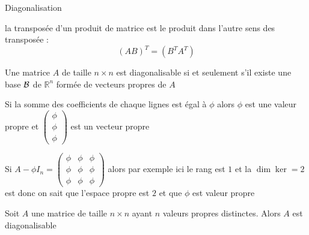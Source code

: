 \begin{parag}{Diagonalisation}
\begin{truc}
    la transposée d'un produit de matrice est le produit dans l'autre sens des transposée :
    \[(AB)^T = (B^TA^T)\]
\end{truc}
    \begin{theoreme}
        Une matrice $A$ de taille $n \times n$ est diagonalisable si et seulement s'il existe une base $\mathcal{B}$ de $\mathbb{R}^n$ formée de vecteurs propres de $A$
    \end{theoreme}
    \begin{truc}
        Si la somme des coefficients de chaque lignes est égal à $\phi$ alors $\phi$ est une valeur propre et $\begin{pmatrix}
            \phi \\ \phi \\ \phi
        \end{pmatrix}$ est un vecteur propre
    \end{truc}
    \begin{truc}
        Si $A - \phi I_n = \begin{pmatrix}
            \phi & \phi & \phi\\
            \phi & \phi & \phi\\
            \phi & \phi & \phi
        \end{pmatrix}$ alors par exemple ici le rang est $1$ et la $\dim \ker = 2$ est donc on sait que l'espace propre est $2$ et que $\phi$ est valeur propre
    \end{truc}
    \begin{theoreme}
        Soit $A$ une matrice de taille $n \times n$ ayant $n$ valeurs propres distinctes. Alors $A$ est diagonalisable
    \end{theoreme}


\end{parag}
